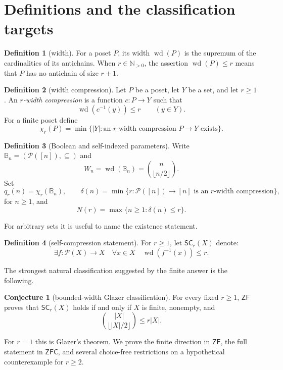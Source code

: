 \documentclass[11pt,letterpaper]{article}
\numberwithin{equation}{section}
\theoremstyle{plain}
\theoremstyle{definition}
\newtheorem{definition}[definition]{Definition}
\newtheorem{conjecture}[conjecture]{Conjecture}
\theoremstyle{remark}
\newcommand{\Pow}{\mathcal P}
\newcommand{\B}{\mathbb B}
\newcommand{\NN}{\mathbb N}
\newcommand{\pwidth}{\operatorname{wd}}
\newcommand{\SC}{\mathsf{SC}}
\newcommand{\ZF}{\mathsf{ZF}}
\newcommand{\ZFC}{\mathsf{ZFC}}
\begin{document}
\section{Definitions and the classification targets}\label{bwc:sec:definitions}

\begin{definition}[width]\label{bwc:def:width}
For a poset $P$, its width $\pwidth(P)$ is the supremum of the cardinalities of
its antichains.  When $r\in\NN_{>0}$, the assertion $\pwidth(P)\leq r$ means that
$P$ has no antichain of size $r+1$.
\end{definition}

\begin{definition}[width compression]\label{bwc:def:compression}
Let $P$ be a poset, let $Y$ be a set, and let $r\geq1$.  An
\emph{$r$-width compression} is a function $c:P\to Y$ such that
\[
       \pwidth(c^{-1}(y))\leq r \qquad(y\in Y).
\]
For a finite poset define
\[
 \chi_r(P)=\min\{|Y|: \text{an $r$-width compression }P\to Y\text{ exists}\}.
\]
\end{definition}

\begin{definition}[Boolean and self-indexed parameters]\label{bwc:def:booleanparams}
Write $\B_n=(\Pow([n]),\subseteq)$ and
\[
 W_n=\pwidth(\B_n)=\binom n{\lfloor n/2\rfloor}.
\]
Set
\[
 q_r(n)=\chi_r(\B_n),\qquad
 \delta(n)=\min\{r:\Pow([n])\to[n]\text{ is an $r$-width compression}\},
\]
for $n\geq1$, and
\[
 N(r)=\max\{n\geq1:\delta(n)\leq r\}.
\]
\end{definition}

For arbitrary sets it is useful to name the existence statement.

\begin{definition}[self-compression statement]\label{bwc:def:SC}
For $r\geq1$, let $\SC_r(X)$ denote:
\[
 \exists f:\Pow(X)\to X\quad
 \forall x\in X\quad \pwidth(f^{-1}(x))\leq r.
\]
\end{definition}

The strongest natural classification suggested by the finite answer is the
following.

\begin{conjecture}[bounded-width Glazer classification]\label{bwc:conj:BWG}
For every fixed $r\geq1$, $\ZF$ proves that $\SC_r(X)$ holds if and only if
$X$ is finite, nonempty, and
\[
 \binom{|X|}{\lfloor |X|/2\rfloor}\leq r|X|.
\]
\end{conjecture}

For $r=1$ this is Glazer's theorem.  We prove the finite direction in $\ZF$,
the full statement in $\ZFC$, and several choice-free restrictions on a
hypothetical counterexample for $r\geq2$.
\end{document}
